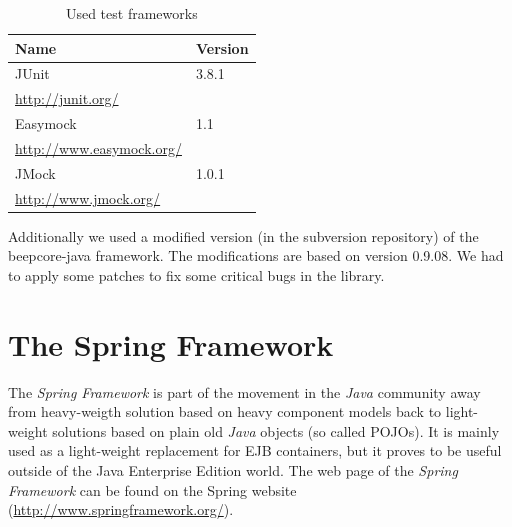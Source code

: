 \begin{table}[H]
 \centering
 \begin{tabular}{|l|l|}
  \hline
   \multicolumn{1}{|p{4.5in}|}{\bfseries{\textsf{Name}}} &
   \multicolumn{1}{|p{0.6in}|}{\bfseries{\textsf{Version}}} \\
  \hline
   \multicolumn{1}{|p{4.5in}|}{JUnit} &
   \multicolumn{1}{|p{0.6in}|}{3.8.1} \\
   \multicolumn{1}{|p{4.5in}|}{\footnotesize{\href{http://junit.org/}{http://junit.org/}}} &
   \multicolumn{1}{|p{0.6in}|}{} \\

  \hline
   \multicolumn{1}{|p{4.5in}|}{Easymock} &
   \multicolumn{1}{|p{0.6in}|}{1.1} \\
   \multicolumn{1}{|p{4.5in}|}{\footnotesize{\href{http://www.easymock.org/}{http://www.easymock.org/}}} &
   \multicolumn{1}{|p{0.6in}|}{} \\

  \hline
   \multicolumn{1}{|p{4.5in}|}{JMock} &
   \multicolumn{1}{|p{0.6in}|}{1.0.1} \\
   \multicolumn{1}{|p{4.5in}|}{\footnotesize{\href{http://www.jmock.org/}{http://www.jmock.org/}}} &
   \multicolumn{1}{|p{0.6in}|}{} \\

  \hline
 \end{tabular}
 \caption{Used test frameworks}
\end{table}

Additionally we used a modified version (in the subversion repository) of the
beepcore-java framework. The modifications are based on version 0.9.08. We
had to apply some patches to fix some critical bugs in the library.


\section{The Spring Framework}

The \emph{Spring Framework} is part of the movement in the \emph{Java}
community away from heavy-weigth solution based on heavy component models
back to light-weight solutions based on plain old \emph{Java} objects
(so called POJOs). It
is mainly used as a light-weight replacement for EJB containers, but it
proves to be useful outside of the Java Enterprise Edition world. The 
web page of the \emph{Spring Framework} can be found on the Spring website
(\href{http://www.springframework.org/}{http://www.springframework.org/}).

